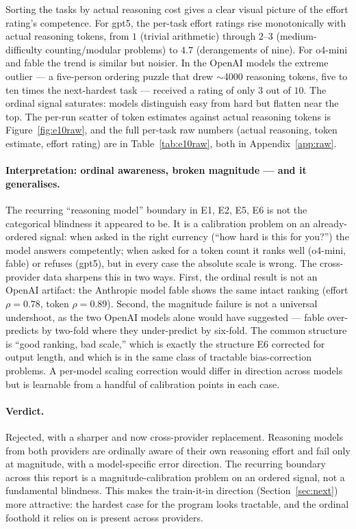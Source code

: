 \documentclass[11pt]{article}
\begin{document}
Sorting the tasks by actual reasoning cost gives a clear visual picture of the effort
rating's competence. For gpt5, the per-task effort ratings rise monotonically with actual
reasoning tokens, from $1$ (trivial arithmetic) through $2$--$3$ (medium-difficulty
counting/modular problems) to $4.7$ (derangements of nine). For o4-mini and fable the trend is
similar but noisier. In the OpenAI models the extreme outlier --- a five-person ordering puzzle
that drew $\sim$4000 reasoning tokens, five to ten times the next-hardest task --- received a
rating of only $3$ out of $10$. The ordinal signal saturates: models distinguish easy from hard
but flatten near the top. The per-run scatter of token estimates against actual reasoning tokens
is Figure~\ref{fig:e10raw}, and the full per-task raw numbers (actual reasoning, token
estimate, effort rating) are in Table~\ref{tab:e10raw}, both in Appendix~\ref{app:raw}.

\paragraph{Interpretation: ordinal awareness, broken magnitude --- and it generalises.} The
recurring ``reasoning model'' boundary in E1, E2, E5, E6 is not the categorical blindness it
appeared to be. It is a calibration problem on an already-ordered signal: when asked in the
right currency (``how hard is this for you?'') the model answers competently; when asked for a
token count it ranks well (o4-mini, fable) or refuses (gpt5), but in every case the absolute
scale is wrong. The cross-provider data sharpens this in two ways. First, the ordinal result is
not an OpenAI artifact: the Anthropic model fable shows the same intact ranking (effort
$\rho = 0.78$, token $\rho = 0.89$). Second, the magnitude failure is not a universal
undershoot, as the two OpenAI models alone would have suggested --- fable over-predicts by
two-fold where they under-predict by six-fold. The common structure is ``good ranking, bad
scale,'' which is exactly the structure E6 corrected for output length, and which is in the same
class of tractable bias-correction problems. A per-model scaling correction would differ in
direction across models but is learnable from a handful of calibration points in each case.

\paragraph{Verdict.} Rejected, with a sharper and now cross-provider replacement. Reasoning
models from both providers are ordinally aware of their own reasoning effort and fail only at
magnitude, with a model-specific error direction. The recurring boundary across this report is
a magnitude-calibration problem on an ordered signal, not a fundamental blindness. This makes
the train-it-in direction (Section~\ref{sec:next}) more attractive: the hardest case for the
program looks tractable, and the ordinal foothold it relies on is present across providers.
\end{document}
